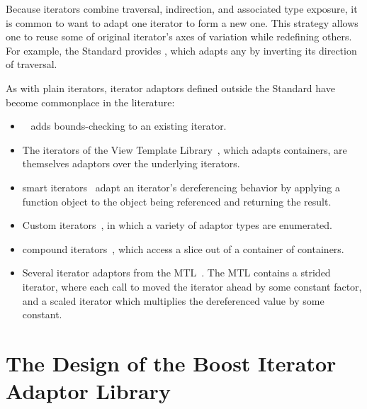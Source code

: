 \documentclass{netobjectdays}
\newcommand{\reverseiterator}{\code{reverse\_\-iterator}}
\begin{document}
Because iterators combine traversal, indirection, and associated type
exposure, it is common to want to adapt one iterator to form a new
one. This strategy allows one to reuse some of original iterator's
axes of variation while redefining others. For example, the Standard
provides \reverseiterator{}, which adapts any
 by inverting its direction of
traversal.

As with plain iterators, iterator adaptors defined outside the
Standard have become commonplace in the literature:\begin{itemize}

\item {}~\cite{stroustrup00:_cpp_prog_lang} adds
bounds-checking to an existing iterator.

 \item The iterators of the View Template
Library~\cite{TMPW00:Weiser}, which adapts containers, are themselves
adaptors over the underlying iterators.

 \item smart iterators~\cite{becker98:_smart_iteraters}
adapt an iterator's dereferencing behavior by applying a
function object to the object being referenced and returning the
result.

 \item Custom iterators~\cite{TMPW00:Baus},
in which a variety of adaptor types are enumerated.

 \item compound iterators~\cite{alexandrescu98:_compound_iters},
   which access a slice out of a container of containers. 

 \item Several iterator adaptors from the MTL~\cite{siek99:_scitools}.
  The MTL contains a strided iterator, where each call to 
  moved the iterator ahead by some constant factor, and a 
  scaled iterator which multiplies the dereferenced value by some
  constant. 

\end{itemize}

\section{The Design of the Boost Iterator Adaptor Library}

\end{document}
